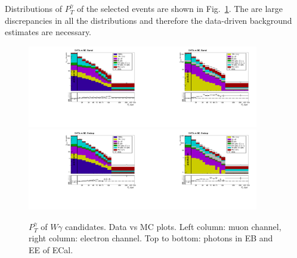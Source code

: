Distributions of $P_T^{\gamma}$ of the selected events are shown in Fig.~\ref{fig:DATAvsMC}. The are large discrepancies in all the distributions and therefore the data-driven background estimates are necessary.

\begin{figure}[htb]
  \begin{center}
   \includegraphics[width=0.45\textwidth]{../figs/figs_v11/MUON_WGamma/PrepareYields/c_TotalDATAvsMC_Barrel__phoEt.pdf}\includegraphics[width=0.45\textwidth]{../figs/figs_v11/ELECTRON_WGamma/PrepareYields/c_TotalDATAvsMC_Barrel__phoEt.pdf}
   \includegraphics[width=0.45\textwidth]{../figs/figs_v11/MUON_WGamma/PrepareYields/c_TotalDATAvsMC_Endcap__phoEt.pdf}\includegraphics[width=0.45\textwidth]{../figs/figs_v11/ELECTRON_WGamma/PrepareYields/c_TotalDATAvsMC_Endcap__phoEt.pdf}
  \caption{$P_T^{\gamma}$ of $W\gamma$ candidates. Data vs MC plots. Left column: muon channel, right column: electron channel. Top to bottom: photons in EB and EE of ECal.}
  \label{fig:DATAvsMC}
  \end{center}
\end{figure}



